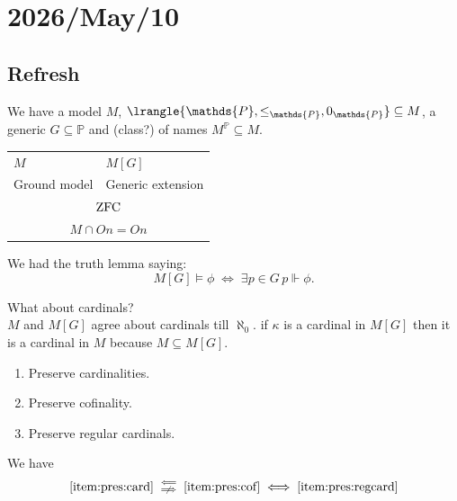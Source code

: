 \documentclass[11pt,pdftex,twoside,a4paper]{article}
\newcommand{\dsP}{\ensuremath{\mathds{P}}}
\newcommand{\forces}{\ensuremath{\Vdash}}
\newcommand{\On}{\ensuremath{\mathit{On}}}
\newcommand{\ZFC}{\ensuremath{\mathop{\rm ZFC}\nolimits}}
\theoremstyle{definition}
\begin{document}
\section{2026/May/10}

\subsection{Refresh}

We have a model $M$, \(\lrangle{\dsP, \leq_\dsP, 0_\dsP} \subseteq M\),
a generic \(G\subseteq \dsP\) and (class?) of names \(M^\dsP \subseteq M\).
\begin{center}
\begin{tabular}{ll}
$M$ & \(M[G]\) \\
Ground model & Generic extension \\
\multicolumn{2}{c}{\ZFC} \\
\multicolumn{2}{c}{\(M\cap\On = \On\)}
\end{tabular}
\end{center}

We had the truth lemma saying:
\begin{equation*}
M[G]\models\phi\;\Leftrightarrow\; \exists p\in G\,p\forces \phi.
\end{equation*}

What about cardinals? \\
$M$ and \(M[G]\) agree about cardinals till \(\aleph_0\).
if \(\kappa\) is a cardinal in \(M[G]\) then it is a cardinal in $M$
because \(M\subseteq M[G]\).

\begin{enumerate}[label={(\alph*)}]
\item Preserve cardinalities. \label{item:pres:card}
\item Preserve cofinality. \label{item:pres:cof}
\item Preserve regular cardinals. \label{item:pres:regcard}
\end{enumerate}

We have
\begin{equation*}
 \textnormal{\ref{item:pres:card}}
 \;\mathrel{\substack{\Longleftarrow \\ \centernot\Longrightarrow}}\;
 \textnormal{\ref{item:pres:cof}}
 \;\Longleftrightarrow\;
 \textnormal{\ref{item:pres:regcard}}
\end{equation*}
\end{document}
